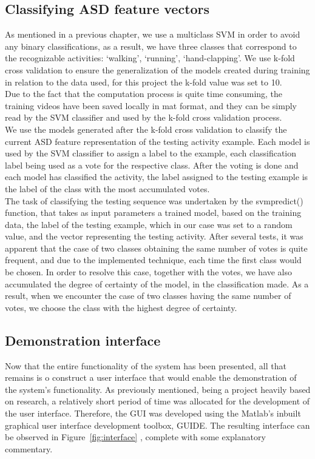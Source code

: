 \documentclass[11pt]{report}
\begin{document}
\subsection{Classifying ASD feature vectors}
As mentioned in a previous chapter, we use a multiclass SVM in order to avoid any binary classifications, as a result, we have three classes that correspond to the recognizable activities: `walking', `running', `hand-clapping'. We use k-fold cross validation to ensure the generalization of the models created during training in relation to the data used, for this project the k-fold value was set to 10. \\
Due to the fact that the computation process is quite time consuming, the training videos have been saved locally in mat format, and they can be simply read by the SVM classifier and used by the k-fold cross validation process. \\
We use the models generated after the k-fold cross validation to classify the current ASD feature representation of the testing activity example. Each model is used by the SVM classifier to assign a label to the example, each classification label being used as a vote for the respective class. After the voting is done and each model has classified the activity, the label assigned to the testing example is the label of the class with the most accumulated votes. \\
The task of classifying the testing sequence was undertaken by the svmpredict() function, that takes as input parameters a trained model, based on the training data, the label of the testing example, which in our case was set to a random value, and the vector representing the testing activity. 
After several tests, it was apparent that the case of two classes obtaining the same number of votes is quite frequent, and due to the implemented technique, each time the first class would be chosen. In order to resolve this case, together with the votes, we have also accumulated the degree of certainty of the model, in the classification made. As a result, when we encounter the case of two classes having the same number of votes, we choose the class with the highest degree of certainty. \\

\subsection{Demonstration interface}
Now that the entire functionality of the system has been presented, all that remains is o construct a user interface that would enable the demonstration of the system's functionality. As previously mentioned, being a project heavily based on research, a relatively short period of time was allocated for the development of the user interface. Therefore, the GUI was developed using the Matlab's inbuilt graphical user interface development toolbox, GUIDE. The resulting interface can be observed in Figure~\ref{fig:interface} , complete with some explanatory commentary. \\
\end{document}
